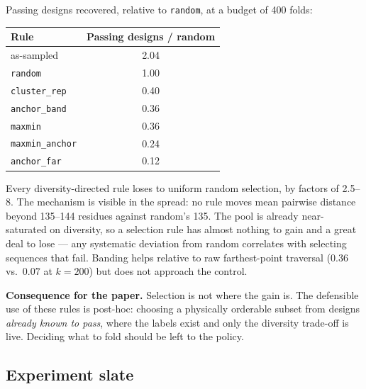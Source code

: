 Passing designs recovered, relative to \texttt{random}, at a budget of 400 folds:

\begin{center}
\begin{tabular}{@{}lc@{}}
\toprule
\textbf{Rule} & \textbf{Passing designs / random} \\
\midrule
as-sampled          & 2.04 \\
\texttt{random}     & 1.00 \\
\texttt{cluster\_rep}   & 0.40 \\
\texttt{anchor\_band}   & 0.36 \\
\texttt{maxmin}         & 0.36 \\
\texttt{maxmin\_anchor} & 0.24 \\
\texttt{anchor\_far}    & 0.12 \\
\bottomrule
\end{tabular}
\end{center}

Every diversity-directed rule loses to uniform random selection, by factors of
\numrange{2.5}{8}. The mechanism is visible in the spread: no rule moves mean
pairwise distance beyond \numrange{135}{144} residues against random's 135. The
pool is already near-saturated on diversity, so a selection rule has almost
nothing to gain and a great deal to lose --- any systematic deviation from
random correlates with selecting sequences that fail. Banding helps relative to
raw farthest-point traversal ($0.36$ vs.\ $0.07$ at $k = 200$) but does not
approach the control.


\textbf{Consequence for the paper.} Selection is not where the gain is. The
defensible use of these rules is post-hoc: choosing a physically orderable
subset from designs \emph{already known to pass}, where the labels exist and
only the diversity trade-off is live. Deciding what to fold should be left to
the policy.

\subsection*{Experiment slate}

